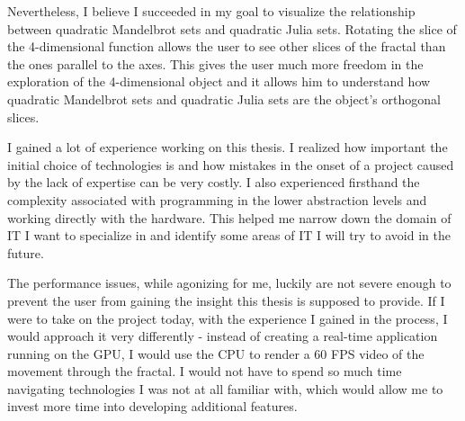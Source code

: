 \documentclass[11pt,a4paper,twoside,openright]{report}
\let\openright=\cleardoublepage
\begin{document}
Nevertheless, I believe I succeeded in my goal to visualize the relationship between quadratic Mandelbrot sets and quadratic Julia sets. Rotating the slice of the 4-dimensional function allows the user to see other slices of the fractal than the ones parallel to the axes. This gives the user much more freedom in the exploration of the 4-dimensional object and it allows him to understand how quadratic Mandelbrot sets and quadratic Julia sets are the object's orthogonal slices. 

I gained a lot of experience working on this thesis. I realized how important the initial choice of technologies is and how mistakes in the onset of a project caused by the lack of expertise can be very costly. I also experienced firsthand the complexity associated with programming in the lower abstraction levels and working directly with the hardware. This helped me narrow down the domain of IT I want to specialize in and identify some areas of IT I will try to avoid in the future. 

The performance issues, while agonizing for me, luckily are not severe enough to prevent the user from gaining the insight this thesis is supposed to provide. If I were to take on the project today, with the experience I gained in the process, I would approach it very differently - instead of creating a real-time application running on the GPU, I would use the CPU to render a 60 FPS video of the movement through the fractal. I would not have to spend so much time navigating technologies I was not at all familiar with, which would allow me to invest more time into developing additional features.

 


\nocite{*}
 \printbibliography[title={Citations},heading={bibintoc}]

\openright
\pagestyle{empty}
\noindent
\listoffigures
{}

 



\end{document}
